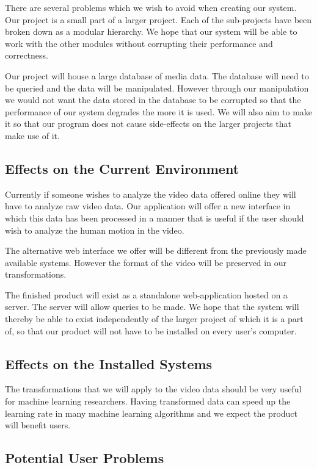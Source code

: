 \documentclass{scrreprt}
\begin{document}
{There are several problems which we wish to avoid when creating our
system. Our project is a small part of a larger project. Each of the
sub-projects have been broken down as a modular hierarchy. We hope that
our system will be able to work with the other modules without
corrupting their performance and correctness.}

{Our project will house a large database of media data. The database
will need to be queried and the data will be manipulated. However through our
manipulation we would not want the data stored in the database to be
corrupted so that the performance of our system degrades the more it is
used. We will also aim to make it so that our program does not cause
side-effects on the larger projects that make use of it.}

\subsection{Effects on the Current Environment}

{Currently if someone wishes to analyze the video data offered online
they will have to analyze raw video data. Our application will offer a
new interface in which this data has been processed in a manner that is
useful if the user should wish to analyze the human motion in the
video.}

{The alternative web interface we offer will be different from the previously
made available systems. However the format of the video will be preserved in
our transformations.}

{The finished product will exist as a standalone web-application hosted on a
server. The server will allow queries to be made. We hope that the system
will thereby be able to exist independently of the larger project of which it
is a part of, so that our product will not have to be installed on every user's
computer.}

\subsection{Effects on the Installed Systems}

{The transformations that we will apply to the video data should be very
useful for machine learning researchers. Having transformed data can
speed up the learning rate in many machine learning algorithms and we
expect the product will benefit users.}

\subsection{Potential User Problems}
\end{document}
